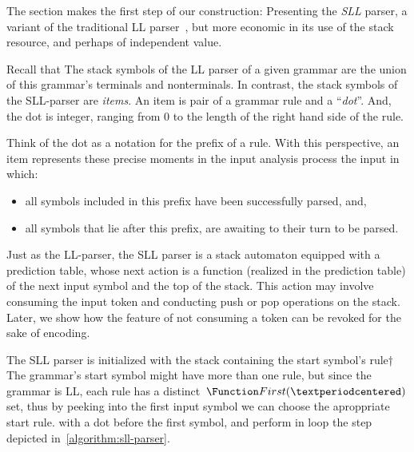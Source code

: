 The section makes the first step of our construction: Presenting the \emph{SLL}
  parser, a variant of the traditional LL parser~\cite{lewis:66}, but more economic in its
  use of the stack resource, and
  perhaps of independent value.

Recall that The stack symbols of the LL parser of a given grammar are the union
of this grammar's terminals and nonterminals. In contrast, the stack symbols of
the SLL-parser are \emph{items}. An item is pair of a grammar rule and a
``\emph{dot}''. And, the dot is integer, ranging from 0 to the length of the
right hand side of the rule. 

Think of the dot as a notation for the prefix of a rule. With this perspective,
an item represents these precise moments in the input analysis process the
input in which: 
\begin{itemize}
  \item all symbols included in this prefix have been successfully parsed, and,
  \item all symbols that lie after this prefix, are awaiting to their turn
      to be parsed.
\end{itemize}

Just as the LL-parser, the SLL parser is a stack automaton equipped with a
prediction table, whose next action is a function (realized in the prediction
table) of the next input symbol and the top of the stack. This action may
involve consuming the input token and conducting push or pop operations on the
stack. Later, we show how the feature of not consuming a token can be revoked
for the sake of encoding.

The SLL parser is initialized with the stack containing the start symbol's rule†{
  The grammar's start symbol might have more than one rule,
  but since the grammar is LL, each rule has a
  distinct~$\Function First(·)$ set, thus by peeking into the
  first input symbol we can choose the aproppriate start rule.}
with a dot before the first symbol, and perform in loop the step depicted
in~\cref{algorithm:sll-parser}.

